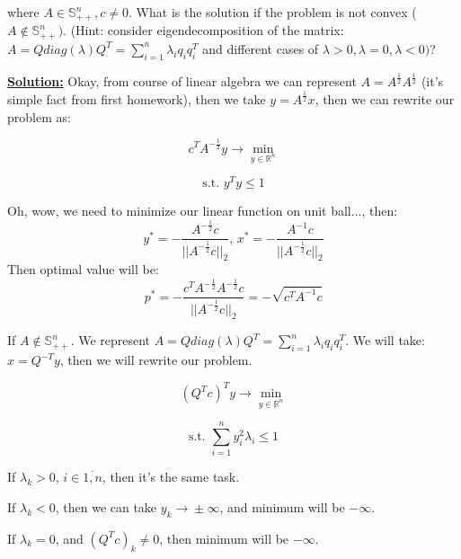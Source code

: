 where $A \in \mathds{S}_{++}^n, c \not = 0$. What is the solution if the problem is not convex ($A \not \in \mathds{S}_{++}^n)$. (Hint: consider eigendecomposition of the matrix: $A = Q diag(\lambda)Q^T = \sum\limits_{i=1}^n \lambda_i q_i q_i^T$ and different cases of $\lambda > 0, \lambda = 0, \lambda < 0)$?

\underline{\textbf{Solution:}}
Okay, from course of linear algebra we can represent $A = A^{\frac{1}{2}}A^{\frac{1}{2}}$ (it's simple fact from first homework), then we take $y = A^{\frac{1}{2}}x$, then we can rewrite our problem as:

\begin{equation*}
    c^TA^{-\frac{1}{2}}y  \xrightarrow{} \min\limits_{y \in \mathds{R}^n}
\end{equation*}

\begin{equation*}
   \text{s.t. } y^Ty \leq 1
\end{equation*}

Oh, wow, we need to minimize our linear function on unit ball..., then:
\begin{equation*}
y^* = - \frac{A^{-\frac{1}{2}}c}{||A^{-\frac{1}{2}}c||_2}\text{, } x^* = - \frac{A^{-1}c}{||A^{-\frac{1}{2}} c ||_2}
\end{equation*}
Then optimal value will be:
\begin{equation*}
    p^* = -\frac{c^TA^{-\frac{1}{2}}A^{-\frac{1}{2}}c}{||A^{-\frac{1}{2}}c||_2} = - \sqrt{c^TA^{-1}c}
\end{equation*}

If $A \not \in \mathds{S}_{++}^n$.
We represent $A = Q diag(\lambda)Q^T = \sum\limits_{i=1}^n \lambda_i q_i q_i^T$.
We will take: $x = Q^{-T}y$, then we will rewrite our problem.

\begin{equation*}
    (Q^Tc)^Ty   \xrightarrow{} \min\limits_{y \in \mathds{R}^n}
\end{equation*}

\begin{equation*}
   \text{s.t. } \sum\limits_{i=1}^n y_i^2 \lambda_i \leq 1
\end{equation*}

If $\lambda_k > 0$, $i \in \overline{1, n}$, then it's the same task.

If $\lambda_k < 0$, then we can take $y_k \xrightarrow{} \pm \infty$, and minimum will be $-\infty$.

If $\lambda_k = 0$, and $(Q^Tc)_k \not = 0$, then minimum will be $-\infty$.

